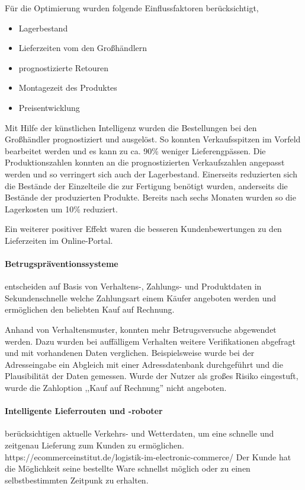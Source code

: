 Für die Optimierung wurden folgende Einflussfaktoren berücksichtigt,

\begin{itemize}
	\item Lagerbestand
	\item Lieferzeiten vom den Großhändlern
	\item prognostizierte Retouren
	\item Montagezeit des Produktes
	\item Preisentwicklung
\end{itemize}

Mit Hilfe der künstlichen Intelligenz wurden die Bestellungen bei den Großhändler prognostiziert und ausgelöst. So konnten Verkaufsspitzen im Vorfeld bearbeitet werden und es kann zu ca. 90\% weniger Lieferengpässen. Die Produktionszahlen konnten an die prognostizierten Verkaufszahlen angepasst werden und so verringert sich auch der Lagerbestand. Einerseits reduzierten sich die Bestände der Einzelteile die zur Fertigung benötigt wurden, anderseits die Bestände der produzierten Produkte. Bereits nach sechs Monaten wurden so die Lagerkosten um 10\% reduziert.\vspace{0.2cm}

Ein weiterer positiver Effekt waren die besseren Kundenbewertungen zu den Lieferzeiten im Online-Portal.

\paragraph{Betrugspräventionssysteme} entscheiden auf Basis von Verhaltens-, Zahlungs- und Produktdaten in Sekundenschnelle welche Zahlungsart einem Käufer angeboten werden und ermöglichen den beliebten Kauf auf Rechnung.\vspace{0.2cm}

Anhand von Verhaltensmuster, konnten mehr Betrugsversuche abgewendet werden. Dazu wurden bei auffälligem Verhalten weitere Verifikationen abgefragt und mit vorhandenen Daten verglichen. Beispielsweise wurde bei der Adresseingabe ein Abgleich mit einer Adressdatenbank durchgeführt und die Plausibilität der Daten gemessen. Wurde der Nutzer als großes Risiko eingestuft, wurde die Zahloption ,,Kauf auf Rechnung'' nicht angeboten.

\paragraph{Intelligente Lieferrouten und -roboter} berücksichtigen aktuelle Verkehrs- und Wetterdaten, um eine schnelle und zeitgenau Lieferung zum Kunden zu ermöglichen.
https://ecommerceinstitut.de/logistik-im-electronic-commerce/
Der Kunde hat die Möglichkeit seine bestellte Ware schnellst möglich oder zu einen selbstbestimmten Zeitpunk zu erhalten.\vspace{0.2cm}

